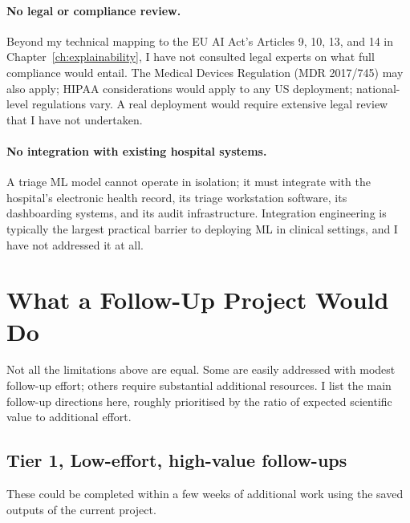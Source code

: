\paragraph{No legal or compliance review.} Beyond my technical mapping to the EU AI Act's Articles 9, 10, 13, and 14 in Chapter~\ref{ch:explainability}, I have not consulted legal experts on what full compliance would entail. The Medical Devices Regulation (MDR 2017/745) may also apply; HIPAA considerations would apply to any US deployment; national-level regulations vary. A real deployment would require extensive legal review that I have not undertaken.

\paragraph{No integration with existing hospital systems.} A triage ML model cannot operate in isolation; it must integrate with the hospital's electronic health record, its triage workstation software, its dashboarding systems, and its audit infrastructure. Integration engineering is typically the largest practical barrier to deploying ML in clinical settings, and I have not addressed it at all.

\section{What a Follow-Up Project Would Do}

Not all the limitations above are equal. Some are easily addressed with modest follow-up effort; others require substantial additional resources. I list the main follow-up directions here, roughly prioritised by the ratio of expected scientific value to additional effort.

\subsection*{Tier 1, Low-effort, high-value follow-ups}

These could be completed within a few weeks of additional work using the saved outputs of the current project.

